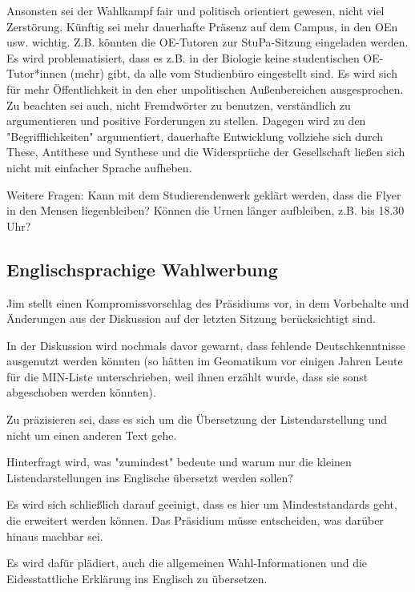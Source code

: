 \documentclass[ngerman,headheight=70pt]{scrartcl}
\begin{document}
    Ansonsten sei der Wahlkampf fair und politisch orientiert gewesen, nicht
    viel Zerstörung. Künftig sei mehr dauerhafte Präsenz auf dem Campus, in den
    OEn usw. wichtig. Z.B. könnten die OE-Tutoren zur StuPa-Sitzung eingeladen
    werden. Es wird problematisiert, dass es z.B. in der Biologie keine
    studentischen OE-Tutor*innen (mehr) gibt, da alle vom Studienbüro
    eingestellt sind. Es wird sich für mehr Öffentlichkeit in den eher
    unpolitischen Außenbereichen ausgesprochen. Zu beachten sei auch, nicht
    Fremdwörter zu benutzen, verständlich zu argumentieren und positive
    Forderungen zu stellen. Dagegen wird zu den "Begrifflichkeiten" argumentiert,
    dauerhafte Entwicklung vollziehe sich durch These, Antithese und Synthese und
    die Widersprüche der Gesellschaft ließen sich nicht mit einfacher Sprache
    aufheben.

    Weitere Fragen: Kann mit dem Studierendenwerk geklärt werden, dass die Flyer
    in den Mensen liegenbleiben? Können die Urnen länger aufbleiben, z.B. bis
    18.30 Uhr?

    \subsection{Englischsprachige Wahlwerbung}

    Jim stellt einen Kompromissvorschlag des Präsidiums vor, in dem Vorbehalte und
    Änderungen aus der Diskussion auf der letzten Sitzung berücksichtigt sind.

    In der Diskussion wird nochmals davor gewarnt, dass fehlende Deutschkenntnisse
    ausgenutzt werden könnten (so hätten im Geomatikum vor einigen Jahren Leute
    für die MIN-Liste unterschrieben, weil ihnen erzählt wurde, dass sie sonst
    abgeschoben werden könnten).

    Zu präzisieren sei, dass es sich um die Übersetzung der Listendarstellung
    und nicht um einen anderen Text gehe.

    Hinterfragt wird, was "zumindest" bedeute und warum nur die kleinen
    Listendarstellungen ins Englische übersetzt werden sollen?

    Es wird sich schließlich darauf geeinigt, dass es hier um Mindeststandards
    geht, die erweitert werden können. Das Präsidium müsse entscheiden, was
    darüber hinaus machbar sei.

    Es wird dafür plädiert, auch die allgemeinen Wahl-Informationen und die
    Eidesstattliche Erklärung ins Englisch zu übersetzen.
\end{document}
